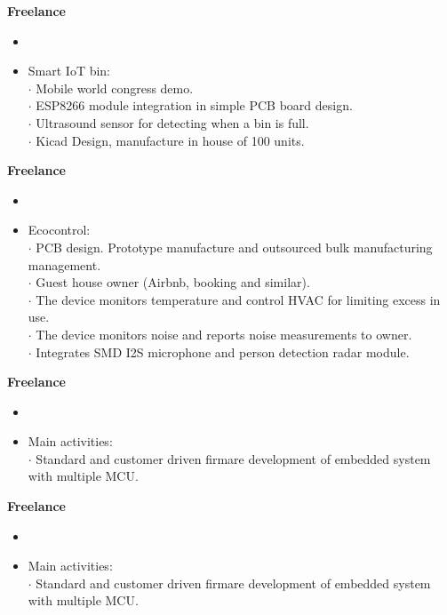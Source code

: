 \documentclass[9pt]{extarticle}
\begin{document}
\textbf{Freelance}\\
\begin{itemize}
    \item[\textbf{}]{\textbf{}}
    \item[\textbf{}]{Smart IoT bin:}\\
    $\cdot${ Mobile world congress demo.}\\
    $\cdot${ ESP8266 module integration in simple PCB board design.}\\
    $\cdot${ Ultrasound sensor for detecting when a bin is full.}\\
    $\cdot${ Kicad Design, manufacture in house of 100 units.}\\
\end{itemize}
\textbf{Freelance}\\
\begin{itemize}
    \item[\textbf{}]{\textbf{}}
    \item[\textbf{}]{Ecocontrol:}\\
    $\cdot${ PCB design. Prototype manufacture and outsourced bulk manufacturing management.}\\
    $\cdot${ Guest house owner (Airbnb, booking and similar).}\\
    $\cdot${ The device monitors temperature and control HVAC for limiting excess in use.}\\
    $\cdot${ The device monitors noise and reports noise measurements to owner.}\\
    $\cdot${ Integrates SMD I2S microphone and person detection radar module.}\\
\end{itemize}
\textbf{Freelance}\\
\begin{itemize}
    \item[\textbf{}]{\textbf{}}
    \item[\textbf{}]{Main activities:}\\
    $\cdot${ Standard and customer driven firmare development of embedded system with multiple MCU.}\\
\end{itemize}
\textbf{Freelance}\\
\begin{itemize}
    \item[\textbf{}]{\textbf{}}
    \item[\textbf{}]{Main activities:}\\
    $\cdot${ Standard and customer driven firmare development of embedded system with multiple MCU.}\\
\end{itemize}
\end{document}
